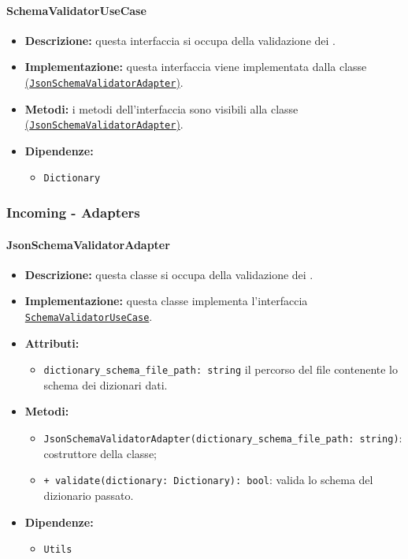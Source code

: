\paragraph{SchemaValidatorUseCase} \label{SchemaValidatorUseCase}
\begin{itemize}
    \item \textbf{Descrizione:} questa interfaccia si occupa della validazione dei .
    \item \textbf{Implementazione:} questa interfaccia viene implementata dalla classe \hyperref[JsonSchemaValidatorAdapter]{(\texttt{JsonSchemaValidatorAdapter})}.
    \item \textbf{Metodi:} i metodi dell'interfaccia sono visibili alla classe \hyperref[JsonSchemaValidatorAdapter]{(\texttt{JsonSchemaValidatorAdapter})}.
    \item \textbf{Dipendenze:}
    \begin{itemize}
        \item \texttt{Dictionary}
    \end{itemize}
\end{itemize}  

\subsubsection{Incoming - Adapters}

\paragraph{JsonSchemaValidatorAdapter} \label{JsonSchemaValidatorAdapter}
\begin{itemize}
    \item \textbf{Descrizione:} questa classe si occupa della validazione dei .
    \item \textbf{Implementazione:} questa classe implementa l'interfaccia \hyperref[SchemaValidatorUseCase]{\texttt{SchemaValidatorUseCase}}.
    \item \textbf{Attributi:}
    \begin{itemize}
        \item \texttt{dictionary\_schema\_file\_path: string} il percorso del file contenente lo schema dei dizionari dati.
    \end{itemize}
    \item \textbf{Metodi:}
    \begin{itemize}
        \item \texttt{JsonSchemaValidatorAdapter(dictionary\_schema\_file\_path: string)}: costruttore della classe;
        \item \texttt{+ validate(dictionary: Dictionary): bool}: valida lo schema del dizionario passato.
    \end{itemize}
    \item \textbf{Dipendenze:}
    \begin{itemize}
        \item \texttt{Utils}
    \end{itemize}
\end{itemize} 

